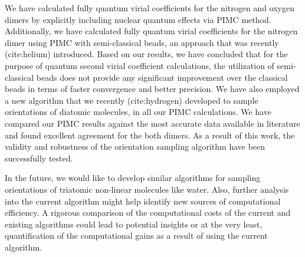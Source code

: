 We have calculated fully quantum virial coefficients for the nitrogen and oxygen dimers by explicitly including nuclear quantum effects via PIMC method. Additionally, we have calculated fully quantum virial coefficients for the nitrogen dimer using PIMC with semi-classical beads, an approach that was recently (cite:helium) introduced. Based on our results, we have concluded that for the purpose of quantum second virial coefficient calculations, the utilization of semi-classical beads does not provide any significant improvement over the classical beads in terms of faster convergence and better precision. We have also employed a new algorithm that we recently (cite:hydrogen) developed to sample orientations of diatomic molecules, in all our PIMC calculations. We have compared our PIMC results against the most accurate data available in literature and found excellent agreement for the both dimers. As a result of this work, the validity and robustness of the orientation sampling algorithm have been successfully tested.

In the future, we would like to develop similar algorithms for sampling orientations of triatomic non-linear molecules like water. Also, further analysis into the current algorithm might help identify new sources of computational efficiency. A rigorous comparison of the computational costs of the current and existing algorithms could lead to potential insights or at the very least, quantification of the computational gains as a result of using the current algorithm.
